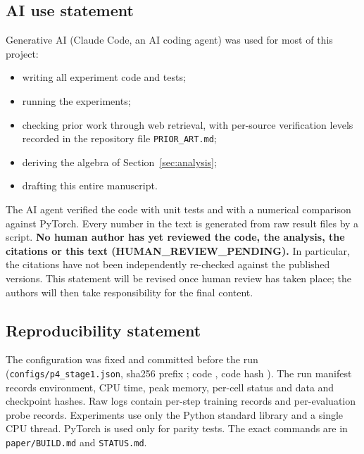 \subsection*{AI use statement}
Generative AI (Claude Code, an AI coding agent) was used for most of this project:
\begin{itemize}
\item writing all experiment code and tests;
\item running the experiments;
\item checking prior work through web retrieval, with per-source verification levels recorded in the
repository file \texttt{PRIOR\_ART.md};
\item deriving the algebra of Section~\ref{sec:analysis};
\item drafting this entire manuscript.
\end{itemize}
The AI agent verified the code with unit tests and with a numerical comparison against PyTorch. Every
number in the text is generated from raw result files by a script. \textbf{No human author has yet
reviewed the code, the analysis, the citations or this text (HUMAN\_REVIEW\_PENDING).} In particular,
the citations have not been independently re-checked against the published versions. This statement will
be revised once human review has taken place; the authors will then take responsibility for the final
content.

\subsection*{Reproducibility statement}
The configuration was fixed and committed before the run (\texttt{configs/p4\_stage1.json}, sha256
prefix \texttt{\RunConfigHash}; code \texttt{\RunCommit}, code hash \texttt{\RunCodeHash}). The run
manifest records environment, CPU time, peak memory, per-cell status and data and checkpoint hashes. Raw
logs contain per-step training records and per-evaluation probe records. Experiments use only the Python
standard library and a single CPU thread. PyTorch is used only for parity tests. The exact commands are
in \texttt{paper/BUILD.md} and \texttt{STATUS.md}.
